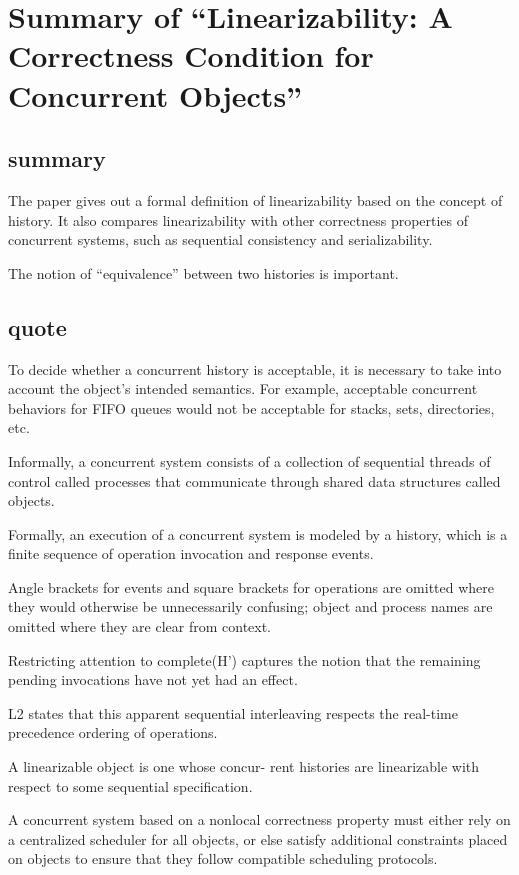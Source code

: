 \documentclass{llncs}
\begin{document}
\section{Summary of ``Linearizability: A Correctness Condition for Concurrent
Objects''\cite{xxx}} 
  \label{section:linearizability_con_obj}
\subsection{summary}
The paper gives out a formal definition of linearizability based on the concept
of history. It also compares linearizability with other correctness properties
of concurrent systems, such as sequential consistency and serializability.

The notion of ``equivalence'' between two histories is important.


\subsection{quote}
To decide whether a concurrent history is acceptable, it is necessary to take
into account the object’s intended semantics. For example, acceptable concurrent
behaviors for FIFO queues would not be acceptable for stacks, sets, directories,
etc.

Informally, a concurrent system consists of a collection of sequential threads of
control called processes that communicate through shared data structures called
objects. 


Formally, an execution of a concurrent system is modeled by a history, which
is a finite sequence of operation invocation and response events. 

Angle brackets
for events and square brackets for operations are omitted where they would
otherwise be unnecessarily confusing; object and process names are omitted
where they are clear from context.

Restricting
attention to complete(H’) captures the notion that the remaining pending
invocations have not yet had an effect.


L2 states that this
apparent sequential interleaving respects the real-time precedence ordering of
operations.

A linearizable object is one whose concur-
rent histories are linearizable with respect to some sequential specification.

A concurrent system based on a nonlocal
correctness property must either rely on a centralized scheduler for all objects,
or else satisfy additional constraints placed on objects to ensure that they follow
compatible scheduling protocols. 
\end{document}
